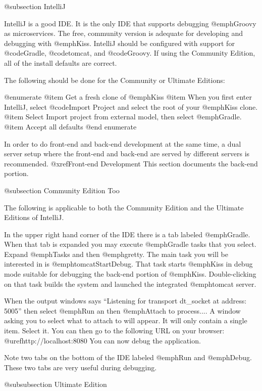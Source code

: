 @subsection IntelliJ

IntelliJ is a good IDE.  It is the only IDE that supports debugging
@emph{Groovy} as microservices.  The free, community version is adequate for developing
and debugging with @emph{Kiss}.  IntelliJ should be configured with
support for @code{Gradle}, @code{tomcat}, and @code{Groovy}.  If using the Community Edition, all of the install defaults are correct. 

The following should be done for the Community or Ultimate Editions:

@enumerate
@item
Get a fresh clone of @emph{Kiss}
@item
When you first enter IntelliJ, select @code{Import Project} and select the root of your @emph{Kiss} clone.
@item
Select Import project from external model, then select @emph{Gradle}.
@item
Accept all defaults
@end enumerate

In order to do front-end and back-end development at the same time, a dual server setup where
the front-end and back-end are served by different servers is recommended.  @xref{Front-end Development}
This section documents the back-end portion.

@subsection Community Edition Too

The following is applicable to both the Community Edition and the Ultimate Editions of IntelliJ.

In the upper right hand corner of the IDE there is a tab labeled @emph{Gradle}.  When that tab is expanded you may execute @emph{Gradle} tasks that you select.
Expand @emph{Tasks} and then @emph{gretty}.  The main task you will be interested in is @emph{tomcatStartDebug}.  That task starts @emph{Kiss}
in debug mode suitable for debugging the back-end portion of @emph{Kiss}.  Double-clicking on that task builds the system and launched the integrated @emph{tomcat}
server.  

When the output windows says ``Listening for transport dt_socket at address: 5005'' then select @emph{Run} an then @emph{Attach to process...}.
A window asking you to select what to attach to will appear.  It will only contain a single item.  Select it. You can then go to the following URL
on your browser:  @uref{http://localhost:8080}  You can now debug the application.

Note two tabs on the bottom of the IDE labeled @emph{Run} and @emph{Debug}.  These two tabs are very useful during debugging.



@subsubsection Ultimate Edition

